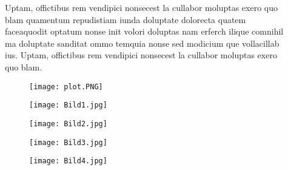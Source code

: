 \documentclass[final]{beamer}
\newlength{\sepwid}
\newlength{\onecolwid}
\begin{document}
\begin{frame}[t]
\begin{columns}[t]
\begin{column}{\onecolwid}
			\end{column}
			
			
			
			\begin{column}{\sepwid}  \end{column}
			
			
			
			
			\begin{column}{\onecolwid} %
				
				\begin{block}{\vspace*{2.7cm}}
					Uptam, offictibus rem vendipici nonsecest la cullabor moluptas exero quo blam quamentum repudistiam iunda doluptate dolorecta quatem faceaquodit optatum nonse init volori doluptas nam erferch ilique comnihil ma doluptate sanditat ommo temquia nonse sed modicium que vollacillab ius. Uptam, offictibus rem vendipici nonsecest la cullabor moluptas exero quo blam.
				\end{block}
				
				\begin{block}{ }
					\begin{figure}
						\vspace*{-1cm}
						\texttt{[image: plot.PNG]}
					\end{figure}
					\begin{figure}
						\texttt{[image: Bild1.jpg]}
					\end{figure}
					
					\begin{multicols}{2}
						\begin{figure}
							\vspace*{-0.95cm}
							\texttt{[image: Bild2.jpg]}
						\end{figure}
						\begin{figure}
							\vspace*{-0.95cm}
							\texttt{[image: Bild3.jpg]}
						\end{figure}
					\end{multicols}
					
					\begin{figure}
						\texttt{[image: Bild4.jpg]}
					\end{figure}
					
				\end{block}
			\end{column}
			

\end{columns}
\end{frame}
\end{document}
